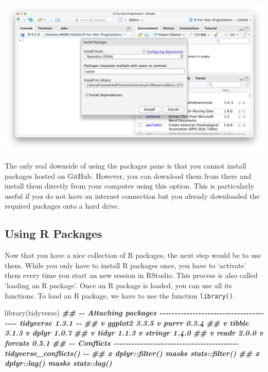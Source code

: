 \documentclass[
]{book}
\newenvironment{Shaded}{\begin{snugshade}}{\end{snugshade}}
\newcommand{\DocumentationTok}[1]{\textcolor[rgb]{0.56,0.35,0.01}{\textbf{\textit{#1}}}}
\newcommand{\FunctionTok}[1]{\textcolor[rgb]{0.00,0.00,0.00}{#1}}
\newcommand{\NormalTok}[1]{#1}
\begin{document}
\begin{enumerate}
  \includegraphics{images/chapter_05_img/install_r_packages/03_install_r_packages.png}
\end{enumerate}

The only real downside of using the packages pane is that you cannot install packages hosted on GitHub. However, you can download them from there and install them directly from your computer using this option. This is particularly useful if you do not have an internet connection but you already downloaded the required packages onto a hard drive.

\hypertarget{using-r-packages}{%
\subsection{Using R Packages}\label{using-r-packages}}

Now that you have a nice collection of R packages, the next step would be to use them. While you only have to install R packages once, you have to `activate' them every time you start an new session in RStudio. This process is also called `loading an R package'. Once an R package is loaded, you can use all its functions. To load an R package, we have to use the function \texttt{library()}.

\begin{Shaded}
\begin{Highlighting}[]
\FunctionTok{library}\NormalTok{(tidyverse)}
\DocumentationTok{\#\# {-}{-} Attaching packages {-}{-}{-}{-}{-}{-}{-}{-}{-}{-}{-}{-}{-}{-}{-}{-}{-}{-}{-}{-}{-}{-}{-}{-}{-}{-}{-}{-}{-}{-}{-}{-}{-}{-}{-}{-}{-}{-}{-} tidyverse 1.3.1 {-}{-}}
\DocumentationTok{\#\# v ggplot2 3.3.5     v purrr   0.3.4}
\DocumentationTok{\#\# v tibble  3.1.3     v dplyr   1.0.7}
\DocumentationTok{\#\# v tidyr   1.1.3     v stringr 1.4.0}
\DocumentationTok{\#\# v readr   2.0.0     v forcats 0.5.1}
\DocumentationTok{\#\# {-}{-} Conflicts {-}{-}{-}{-}{-}{-}{-}{-}{-}{-}{-}{-}{-}{-}{-}{-}{-}{-}{-}{-}{-}{-}{-}{-}{-}{-}{-}{-}{-}{-}{-}{-}{-}{-}{-}{-}{-}{-}{-}{-}{-}{-} tidyverse\_conflicts() {-}{-}}
\DocumentationTok{\#\# x dplyr::filter() masks stats::filter()}
\DocumentationTok{\#\# x dplyr::lag()    masks stats::lag()}
\end{Highlighting}
\end{Shaded}
\end{document}
